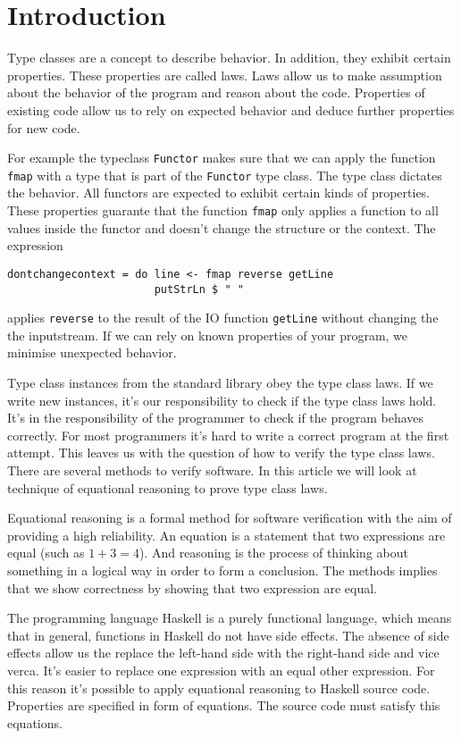 \section{Introduction}
\label{sec:intro}

Type classes are a concept to describe behavior. In addition, they exhibit certain properties. These properties are called laws. 
Laws allow us to make assumption about the behavior of the program and reason about the code. Properties of existing code allow us to rely on expected behavior and deduce further properties for new code.

For example the typeclass \verb|Functor| makes sure that we can apply the function \verb|fmap| with a type that is part of the \verb|Functor| type class. The type class dictates the behavior. All functors are expected to exhibit certain kinds of properties. These properties guarante that the function \verb|fmap| only applies a function to all values inside the functor and doesn't change the structure or the context. The expression
\begin{verbatim}
dontchangecontext = do line <- fmap reverse getLine
                       putStrLn $ " "
\end{verbatim}
applies \verb|reverse| to the result of the IO function \verb|getLine| without changing the the inputstream. 
If we can rely on known properties of your program, we minimise unexpected behavior.

Type class instances from the standard library obey the type class laws. If we write new instances, it's our responsibility to check if the type class laws hold.
It's in the responsibility of the programmer to check if the program behaves correctly. For most programmers it's hard to write a correct program at the first attempt. This leaves us with the question of how to verify the type class laws. There are several methods to verify software. In this article we will look at technique of equational reasoning to prove type class laws. 

Equational reasoning is a formal method for software verification with the aim of providing a high reliability. An equation is a statement that two expressions are equal (such as $1 + 3 = 4$). And reasoning is the process of thinking about something in a logical way in order to form a conclusion. The methods implies that we show correctness by showing that two expression are equal. 

The programming language Haskell is a purely functional language, which means that in general, functions in Haskell do not have side effects. The absence of side effects allow us the replace the left-hand side with the right-hand side and vice verca. It's easier to replace one expression with an equal other expression. For this reason it's possible to apply equational reasoning to Haskell source code. 
Properties are specified in form of equations. The source code must satisfy this equations. 

